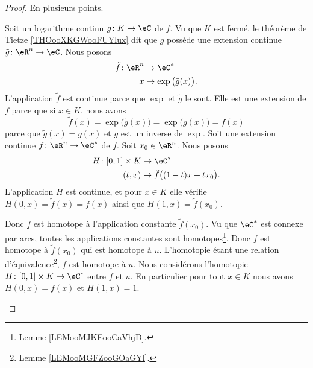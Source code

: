 \begin{proof}
	En plusieurs points.
	\begin{subproof}
		\spitem[\ref{ITEMooKZYDooKoEEbl} \( \Rightarrow\) \ref{ITEMooQDHXooObjxLA}]
		Soit un logarithme continu \( g\colon K\to \eC\) de \( f\). Vu que \( K\) est fermé, le théorème de Tietze \ref{THOooXKGWooFUYlux} dit que \( g\) possède une extension continue \( \tilde g\colon \eR^n\to \eC\). Nous posons
		\begin{equation}
			\begin{aligned}
				\tilde f\colon \eR^n & \to \eC^*                            \\
				x                    & \mapsto \exp\big( \tilde g(x) \big).
			\end{aligned}
		\end{equation}
		L'application \( \tilde f\) est continue parce que \( \exp\) et \( \tilde g\) le sont. Elle est une extension de \( f\) parce que si \( x\in K\), nous avons
		\begin{equation}
			\tilde f(x)=\exp\big( \tilde g(x) \big)=\exp\big( g(x) \big)=f(x)
		\end{equation}
		parce que \( \tilde g(x)=g(x)\) et \( g\) est un inverse de \( \exp\).
		\spitem[\ref{ITEMooQDHXooObjxLA} \( \Rightarrow\) \ref{ITEMooXVNXooVAHklr}]
		Soit une extension continue \( \tilde f\colon \eR^n\to \eC^*\) de \( f\). Soit \( x_0\in \eR^n\). Nous posons
		\begin{equation}
			\begin{aligned}
				H\colon \mathopen[ 0 , 1 \mathclose]\times K & \to \eC^*                                \\
				(t,x)                                        & \mapsto \tilde f\big( (1-t)x+tx_0 \big).
			\end{aligned}
		\end{equation}
		L'application \( H\) est continue, et pour \( x\in K\) elle vérifie \( H(0,x)=\tilde f(x)=f(x)\) ainsi que \( H(1,x)=\tilde f(x_0)\).

		Donc \( f\) est homotope à l'application constante \( \tilde f(x_0)\). Vu que \( \eC^*\) est connexe par arcs, toutes les applications constantes sont homotopes\footnote{Lemme \ref{LEMooMJKEooCaVhjD}.}. Donc \( f\) est homotope à \( \tilde f(x_0)\) qui est homotope à \( u\). L'homotopie étant une relation d'équivalence\footnote{Lemme \ref{LEMooMGFZooGOaGYl}.}, \( f\) est homotope à \( u\).
		\spitem[\ref{ITEMooXVNXooVAHklr} \( \Rightarrow\) \ref{ITEMooKZYDooKoEEbl}]
		Nous considérons l'homotopie \( H\colon \mathopen[ 0 , 1 \mathclose]\times K\to \eC^*\) entre \( f\) et \( u\). En particulier pour tout \( x\in K\) nous avons \( H(0,x)=f(x)\) et \( H(1,x)=1\).


\end{subproof}
\end{proof}
